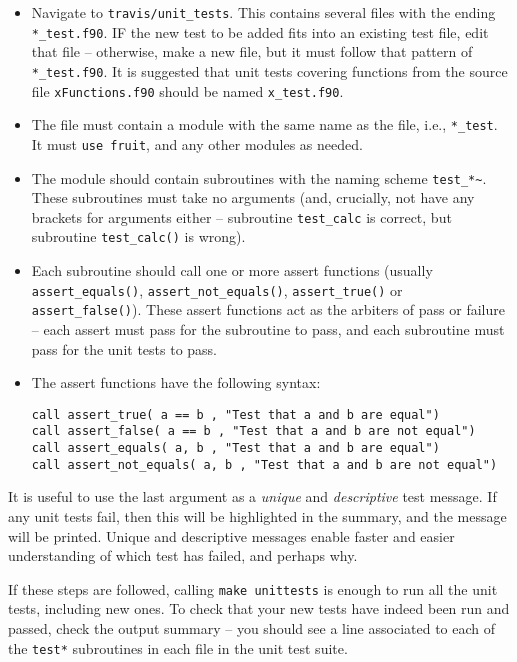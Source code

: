 \begin{itemize}
\item Navigate to \texttt{travis/unit\_tests}. This contains several
  files with the ending \texttt{*\_test.f90}. IF the new test to be
  added fits into an existing test file, edit that file -- otherwise,
  make a new file, but it must follow that pattern of
  \texttt{*\_test.f90}. It is suggested that unit tests covering
  functions from the source file \texttt{xFunctions.f90} should be
  named \texttt{x\_test.f90}.
\item The file must contain a module with the same name as the file,
  i.e., \texttt{*\_test}. It must \texttt{use\ fruit}, and any other
  modules as needed.
\item The module should contain subroutines with the naming scheme
  \texttt{test\_*\textasciitilde{}}. These subroutines must take no
  arguments (and, crucially, not have any brackets for arguments
  either -- subroutine \texttt{test\_calc} is correct, but subroutine
  \texttt{test\_calc()} is wrong).
\item Each subroutine should call one or more assert functions
  (usually \texttt{assert\_equals()}, \texttt{assert\_not\_equals()},
  \texttt{assert\_true()} or \texttt{assert\_false()}). These assert
  functions act as the arbiters of pass or failure -- each assert must
  pass for the subroutine to pass, and each subroutine must pass for
  the unit tests to pass.
\item The assert functions have the following syntax:

\begin{verbatim}
call assert_true( a == b , "Test that a and b are equal")
call assert_false( a == b , "Test that a and b are not equal")
call assert_equals( a, b , "Test that a and b are equal")
call assert_not_equals( a, b , "Test that a and b are not equal")
\end{verbatim}

\end{itemize}

It is useful to use the last argument as a \emph{unique} and
\emph{descriptive} test message. If any unit tests fail, then this
will be highlighted in the summary, and the message will be
printed. Unique and descriptive messages enable faster and easier
understanding of which test has failed, and perhaps why.

If these steps are followed, calling \texttt{make\ unittests} is
enough to run all the unit tests, including new ones. To check that
your new tests have indeed been run and passed, check the output
summary -- you should see a line associated to each of the
\texttt{test*} subroutines in each file in the unit test suite.

